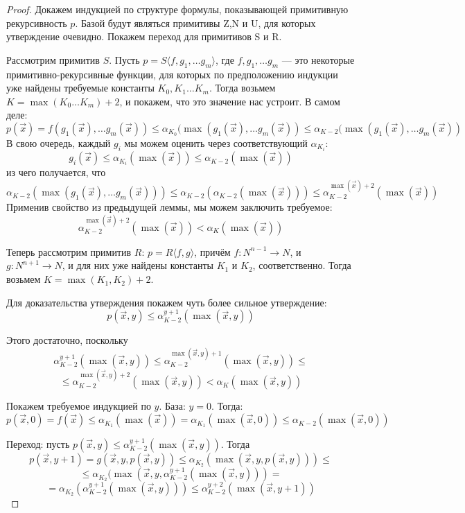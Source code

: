 \begin{proof}
Докажем индукцией по структуре формулы, показывающей примитивную 
рекурсивность $p$.
Базой будут являться примитивы Z,N и U, для которых утверждение очевидно.
Покажем переход для примитивов S и R.

Рассмотрим примитив $S$. Пусть $p = S\langle f,g_1,\dots g_m \rangle$,
где $f, g_1, \dots g_m$ --- это некоторые примитивно-рекурсивные функции, 
для которых по предположению индукции уже найдены требуемые константы 
$K_0, K_1 \dots K_m$.
Тогда возьмем $K = \max (K_0 \dots K_m)+2$, и покажем, что это значение нас
устроит.
В самом деле: 
$$p(\overrightarrow{x}) = f(g_1(\overrightarrow{x}), \dots g_m(\overrightarrow{x}))
\le \alpha_{K_0}(\max (g_1(\overrightarrow{x}), \dots g_m(\overrightarrow{x})) 
\le \alpha_{K-2}(\max (g_1(\overrightarrow{x}), \dots g_m(\overrightarrow{x}))$$
В свою очередь, каждый $g_i$ мы можем оценить через соответствующий $\alpha_{K_i}$:
$$g_i(\overrightarrow{x}) \le \alpha_{K_i}(\max(\overrightarrow{x})) \le \alpha_{K-2}(\max(\overrightarrow{x}))$$
из чего получается, что 
$$\alpha_{K-2}(\max (g_1(\overrightarrow{x}), \dots g_m(\overrightarrow{x}))) \le 
\alpha_{K-2}(\alpha_{K-2}(\max(\overrightarrow{x}))) \le \alpha_{K-2}^{\max(\overrightarrow{x})+2}(\max(\overrightarrow{x}))$$
Применив свойство из предыдущей леммы, мы можем заключить требуемое:
$$\alpha_{K-2}^{\max(\overrightarrow{x})+2}(\max(\overrightarrow{x})) < \alpha_K(\max(\overrightarrow{x}))$$

Теперь рассмотрим примитив $R$: $p = R\langle f,g \rangle$,
причём $f: N^{n-1} \rightarrow N$, и $g: N^{n+1} \rightarrow N$,
и для них уже найдены константы $K_1$ и $K_2$, соответственно.
Тогда возьмем $K = \max(K_1, K_2)+2$.

Для доказательства утверждения покажем чуть более сильное утверждение:
$$p(\overrightarrow{x},y) \le \alpha_{K-2}^{y+1}(\max(\overrightarrow{x},y))$$

Этого достаточно, поскольку 
$$\alpha_{K-2}^{y+1}(\max(\overrightarrow{x},y)) \le
\alpha_{K-2}^{\max(\overrightarrow{x},y)+1}(\max(\overrightarrow{x},y)) \le$$
$$\le \alpha_{K-2}^{\max(\overrightarrow{x},y)+2}(\max(\overrightarrow{x},y)) <
\alpha_K(\max(\overrightarrow{x},y))$$

Покажем требуемое индукцией по $y$.
База: $y = 0$. Тогда: $$p(\overrightarrow{x},0) = f(\overrightarrow{x}) \le 
\alpha_{K_1}(\max(\overrightarrow{x})) = \alpha_{K_1}(\max(\overrightarrow{x},0)) \le 
\alpha_{K-2}(\max(\overrightarrow{x},0))$$

Переход: пусть $p(\overrightarrow{x},y) \le \alpha^{y+1}_{K-2}(\max(\overrightarrow{x},y))$.
Тогда $$p(\overrightarrow{x},y+1) = g(\overrightarrow{x},y,p(\overrightarrow{x},y))
\le \alpha_{K_2}(\max(\overrightarrow{x},y,p(\overrightarrow{x},y))) \le$$
$$\le \alpha_{K_2}(\max(\overrightarrow{x},y,\alpha^{y+1}_{K-2}(\max(\overrightarrow{x},y))) =$$
$$= \alpha_{K_2}(\alpha^{y+1}_{K-2}(\max(\overrightarrow{x},y)))
\le \alpha^{y+2}_{K-2}(\max(\overrightarrow{x},y+1))$$
\end{proof}

